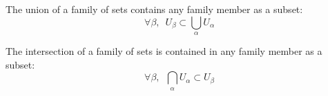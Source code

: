 \begin{thm}
  The union of a family of sets contains any family member as a subset:
  \begin{equation}
    \forall\beta,\enspace U_{\beta}\subset\bigcup_{\alpha}U_{\alpha}
  \end{equation}
\end{thm}

\begin{thm}
  The intersection of a family of sets is contained in any family member
  as a subset:
  \begin{equation}
    \forall\beta,\enspace \bigcap_{\alpha}U_{\alpha}\subset U_{\beta}
  \end{equation}
\end{thm}

